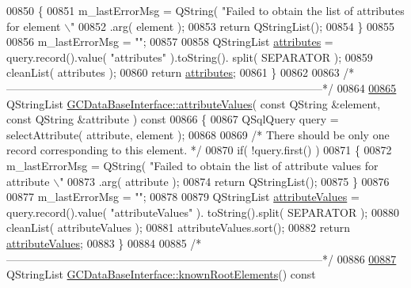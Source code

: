 \begin{DoxyCode}
{{{{{{{{{{{{{{{{{{{{{{{{{{{{{{{00850   \{
00851     m\_lastErrorMsg = QString( \textcolor{stringliteral}{"Failed to obtain the list of attributes for
       element \(\backslash\)"%
00852         .arg( element );
00853     \textcolor{keywordflow}{return} QStringList();
00854   \}
00855 
00856   m\_lastErrorMsg = \textcolor{stringliteral}{""};
00857 
00858   QStringList \hyperlink{class_g_c_data_base_interface_afb1e49e08f98ca453f9ac66340a35642}{attributes} = query.record().value( \textcolor{stringliteral}{"attributes"} ).toString().
      split( SEPARATOR );
00859   cleanList( attributes );
00860   \textcolor{keywordflow}{return} \hyperlink{class_g_c_data_base_interface_afb1e49e08f98ca453f9ac66340a35642}{attributes};
00861 \}
00862 
00863 \textcolor{comment}{/*
      --------------------------------------------------------------------------------------*/}
00864 
\hypertarget{gcdatabaseinterface_8cpp_source_l00865}{}\hyperlink{class_g_c_data_base_interface_a329e17f6c02c62fd554884f2b5a7e2df}{00865} QStringList \hyperlink{class_g_c_data_base_interface_a329e17f6c02c62fd554884f2b5a7e2df}{GCDataBaseInterface::attributeValues}( \textcolor{keyword}{const} QString &element, \textcolor{keyword}{const}
       QString &attribute )\textcolor{keyword}{ const}
00866 \textcolor{keyword}{}\{
00867   QSqlQuery query = selectAttribute( attribute, element );
00868 
00869   \textcolor{comment}{/* There should be only one record corresponding to this element. */}
00870   \textcolor{keywordflow}{if}( !query.first() )
00871   \{
00872     m\_lastErrorMsg = QString( \textcolor{stringliteral}{"Failed to obtain the list of attribute values
       for attribute \(\backslash\)"%
00873         .arg( attribute );
00874     \textcolor{keywordflow}{return} QStringList();
00875   \}
00876 
00877   m\_lastErrorMsg = \textcolor{stringliteral}{""};
00878 
00879   QStringList \hyperlink{class_g_c_data_base_interface_a329e17f6c02c62fd554884f2b5a7e2df}{attributeValues} = query.record().value( \textcolor{stringliteral}{"attributeValues"} ).
      toString().split( SEPARATOR );
00880   cleanList( attributeValues );
00881   attributeValues.sort();
00882   \textcolor{keywordflow}{return} \hyperlink{class_g_c_data_base_interface_a329e17f6c02c62fd554884f2b5a7e2df}{attributeValues};
00883 \}
00884 
00885 \textcolor{comment}{/*
      --------------------------------------------------------------------------------------*/}
00886 
\hypertarget{gcdatabaseinterface_8cpp_source_l00887}{}\hyperlink{class_g_c_data_base_interface_ac5c57277f9476ab74cfe13fbcee52f15}{00887} QStringList \hyperlink{class_g_c_data_base_interface_ac5c57277f9476ab74cfe13fbcee52f15}{GCDataBaseInterface::knownRootElements}()\textcolor{keyword}{ const}
}}}}}}}}}}}}}}}}}}}}}}}}}}}}}}}}}
\end{DoxyCode}
